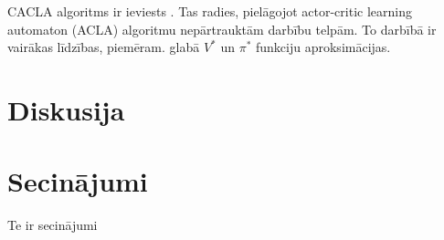 \documentclass{ludis} %
\begin{document}
CACLA algoritms ir ieviests \autocite{Hasselt2007}. Tas radies, pielāgojot actor-critic learning automaton (ACLA) algoritmu nepārtrauktām darbību telpām. To darbībā ir vairākas līdzības, piemēram. glabā $V^*$ un $\pi^*$ funkciju aproksimācijas.

\chapter{Diskusija}
\chapter{Secinājumi}
Te ir secinājumi

\printbibliography
\end{document}
